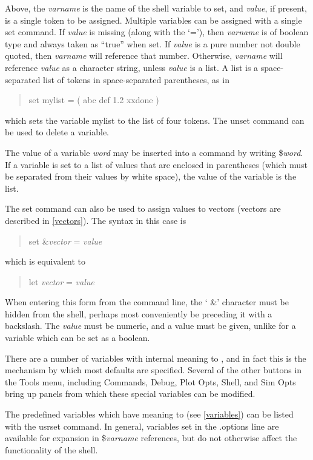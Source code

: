 Above, the {\it varname} is the name of the shell variable to set, and
{\it value}, if present, is a single token to be assigned. 
Multiple variables can be assigned with a single {\cb set} command. 
If {\it value} is missing (along with the `{\vt =}'), then {\it
varname} is of boolean type and always taken as ``true'' when set. 
If {\it value} is a pure number not double quoted, then {\it
varname} will reference that number.  Otherwise, {\it varname} will
reference {\it value} as a character string, unless {\it value} is
a list.  A list is a space-separated list of tokens in space-separated
parentheses, as in
\begin{quote}\vt
set mylist = ( abc def 1.2 xxdone )
\end{quote}
which sets the variable {\vt mylist} to the list of four tokens.  The
{\cb unset} command can be used to delete a variable.

The value of a variable {\it word\/} may be inserted into a command by
writing {\vt \${\it word}}.  If a variable is set to a list of values
that are enclosed in parentheses (which must be separated from their
values by white space), the value of the variable is the list.

The set command can also be used to assign values to vectors (vectors
are described in \ref{vectors}).  The syntax in this case is
 
\begin{quote}
{\vt set \&}{\it vector} {\vt =} {\it value}
\end{quote}
 
which is equivalent to
 
\begin{quote}
{\vt let} {\it vector} {\vt =} {\it value}
\end{quote}
 
When entering this form from the {\WRspice} command line, the `{\vt
\&}' character must be hidden from the shell, perhaps most
conveniently be preceding it with a backslash.  The {\it value} must
be numeric, and a value must be given, unlike for a variable which can
be set as a boolean.

There are a number of variables with internal meaning to {\WRspice},
and in fact this is the mechanism by which most {\WRspice} defaults
are specified.  Several of the other buttons in the {\cb Tools} menu,
including {\cb Commands}, {\cb Debug}, {\cb Plot Opts}, {\cb Shell},
and {\cb Sim Opts} bring up panels from which these special variables
can be modified.

The predefined variables which have meaning to {\WRspice} (see
\ref{variables}) can be listed with the {\cb usrset} command.  In
general, variables set in the {\vt .options} line are available for
expansion in {\vt \$}{\it varname} references, but do not otherwise
affect the functionality of the shell.

